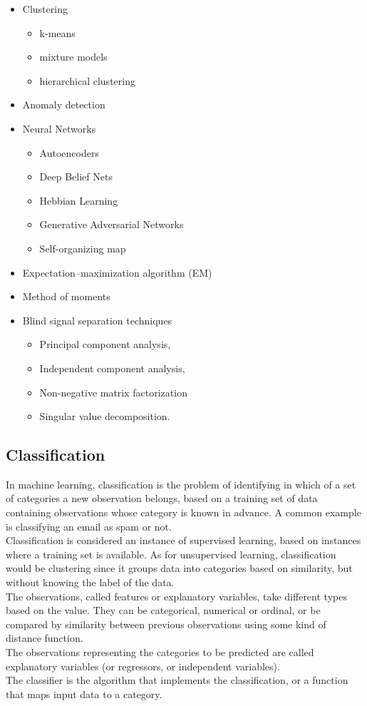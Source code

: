 \begin{itemize}[noitemsep]
	\item Clustering
	\begin{itemize}[noitemsep]
		\item k-means
		\item mixture models
		\item hierarchical clustering
	\end{itemize}
	\item Anomaly detection
	\item Neural Networks
	\begin{itemize}[noitemsep]
		\item Autoencoders
		\item Deep Belief Nets
		\item Hebbian Learning
		\item Generative Adversarial Networks
		\item Self-organizing map
	\end{itemize}
	\item Expectation–maximization algorithm (EM)
	\item Method of moments
	\item Blind signal separation techniques
	\begin{itemize}[noitemsep]
		\item Principal component analysis,
		\item Independent component analysis,
		\item Non-negative matrix factorization
		\item Singular value decomposition.
	\end{itemize}
\end{itemize}

\subsection{Classification} \label{classification}
In machine learning, classification is the problem of identifying in which of a set of categories a new observation belongs, based on a training set of data containing observations whose category is known in advance. A common example is classifying an email as spam or not.\\
Classification is considered an instance of supervised learning, based on instances where a training set is available. As for unsupervised learning, classification would be clustering since it groups data into categories based on similarity, but without knowing the label of the data.\\
The observations, called features or explanatory variables, take different types based on the value. They can be categorical, numerical or ordinal, or be compared by similarity between previous observations using some kind of distance function.\\
The observations representing the categories to be predicted are called explanatory variables (or regressors, or independent variables).\\
The classifier is the algorithm that implements the classification, or a function that maps input data to a category.

